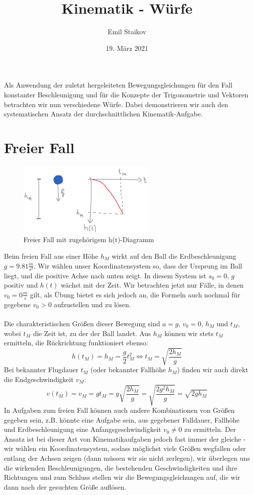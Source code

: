 \documentclass[11pt]{article}
\title{Kinematik - Würfe}
\author{Emil Staikov}
\date{19. März 2021}
\begin{document}
\maketitle
Als Anwendung der zuletzt hergeleiteten Bewegungsgleichungen für den Fall konstanter Beschleunigung und für die Konzepte der Trigonometrie und Vektoren betrachten wir nun verschiedene Würfe. Dabei demonstrieren wir auch den systematischen Ansatz der durchschnittlichen Kinematik-Aufgabe.

\section{Freier Fall}
\begin{figure}[H] 
    \centering
       \includegraphics[width=0.6\textwidth]{freier-fall.png}
       \caption{Freier Fall mit zugehörigem h(t)-Diagramm} 
\end{figure} 
Beim freien Fall aus einer Höhe $h_M$ wirkt auf den Ball die Erdbeschleunigung $g=9.81 \frac{m}{s^2}$. Wir wählen unser Koordinatensystem so, dass der Ursprung im Ball liegt, und die positive Achse nach unten zeigt. In diesem System ist $s_0 = 0$, $g$ positiv und $h(t)$ wächst mit der Zeit. Wir betrachten jetzt nur Fälle, in denen $v_0 = 0 \frac{m}{s}$ gilt, als Übung bietet es sich jedoch an, die Formeln auch nochmal für gegebene $v_0 > 0$ aufzustellen und zu lösen. \\\\
Die charakteristischen Größen dieser Bewegung sind $a = g$, $v_0 = 0$, $h_M$ und $t_M$, wobei $t_M$ die Zeit ist, zu der der Ball landet. Aus $h_M$ können wir stets $t_M$ ermitteln, die Rückrichtung funktioniert ebenso: 
\begin{equation*}
    h(t_M) = h_M = \frac{g}{2}t_M^2 \Longleftrightarrow t_M = \sqrt{\frac{2h_M}{g}}
\end{equation*}
Bei bekannter Flugdauer $t_M$ (oder bekannter Fallhöhe $h_M$) finden wir auch direkt die Endgeschwindigkeit $v_M$: 
\begin{equation*}
    v(t_M) = v_M = gt_M = g\sqrt{\frac{2h_M}{g}} = \sqrt{\frac{2g^2h_M}{g}} = \sqrt{2gh_M}
\end{equation*}
In Aufgaben zum freien Fall können auch andere Kombinationen von Größen gegeben sein, z.B. könnte eine Aufgabe sein, aus gegebener Falldauer, Fallhöhe und Erdbeschleunigung eine Anfangsgeschwindigkeit $v_0 \neq 0$ zu ermitteln. Der Ansatz ist bei dieser Art von Kinematikaufgaben jedoch fast immer der gleiche - wir wählen ein Koordinatensystem, sodass möglichst viele Größen wegfallen oder entlang der Achsen zeigen (dann müssen wir sie nicht zerlegen), wir überlegen uns die wirkenden Beschleunigungen, die bestehenden Geschwindigkeiten und ihre Richtungen und zum Schluss stellen wir die Bewegungsgleichungen auf, die wir dann nach der gesuchten Größe auflösen. 
\end{document}
